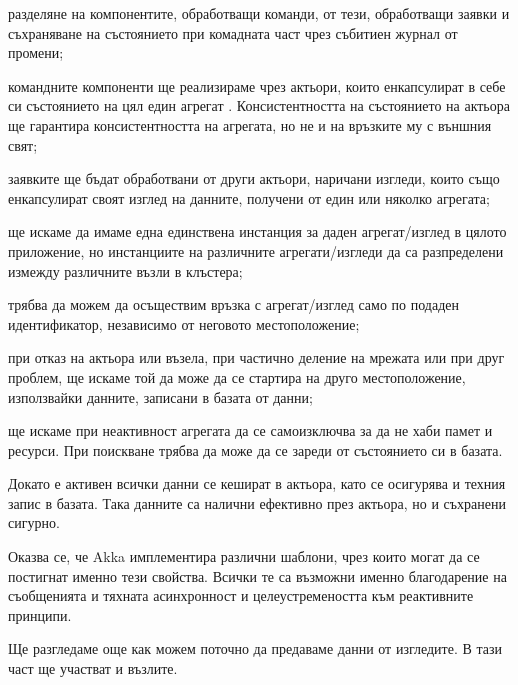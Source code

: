 \begin{itemize*}
  \item разделяне на компонентите, обработващи команди, от тези, обработващи заявки и съхраняване на състоянието при комадната част чрез събитиен журнал от промени;
  
  \item командните компоненти ще реализираме чрез актьори, които енкапсулират в себе си състоянието на цял един агрегат \cite{evans2003DDD}. Консистентността на състоянието на актьора ще гарантира консистентността на агрегата, но не и на връзките му с външния свят;
  
  \item заявките ще бъдат обработвани от други актьори, наричани изгледи, които също енкапсулират своят изглед на данните, получени от един или няколко агрегата;
  
  \item ще искаме да имаме една единствена инстанция за даден агрегат/изглед в цялото приложение, но инстанциите на различните агрегати/изгледи да са разпределени измежду различните възли в клъстера;
  
  \item трябва да можем да осъществим връзка с агрегат/изглед само по подаден идентификатор, независимо от неговото местоположение;
  
  \item при отказ на актьора или възела, при частично деление на мрежата или при друг проблем, ще искаме той да може да се стартира на друго местоположение, използвайки данните, записани в базата от данни;
  
  \item ще искаме при неактивност агрегата да се самоизключва за да не хаби памет и ресурси. При поискване трябва да може да се зареди от състоянието си в базата.
  
  \item Докато е активен всички данни се кешират в актьора, като се осигурява и техния запис в базата. Така данните са налични ефективно през актьора, но и съхранени сигурно.
\end{itemize*}

Оказва се, че Akka имплементира различни шаблони, чрез които могат да се постигнат именно тези свойства. Всички те са възможни именно благодарение на съобщенията и тяхната асинхронност и целеустремеността към реактивните принципи.

Ще разгледаме още как можем поточно да предаваме данни от изгледите. В тази част ще участват  и  възлите.

